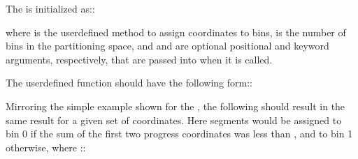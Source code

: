 \documentclass[letterpaper,10pt,english]{sphinxmanual}
\begin{document}
The  is initialized as::

\begin{sphinxVerbatim}[commandchars=\\\{\}]
     
\end{sphinxVerbatim}

where  is the user\sphinxhyphen{}defined method to assign coordinates to bins,
 is the number of bins in the partitioning space, and  and
 are optional positional and keyword arguments, respectively, that
are passed into  when it is called.

The user\sphinxhyphen{}defined function should have the following form::

\begin{sphinxVerbatim}[commandchars=\\\{\}]
   
\end{sphinxVerbatim}

Mirroring the simple example shown for the , the following
should result in the same result for a given set of coordinates. Here segments
would be assigned to bin 0 if the sum of the first two progress coordinates was
less than , and to bin 1 otherwise, where ::

\begin{sphinxVerbatim}[commandchars=\\\{\}]
  
     \PYG{p}{[}\PYG{p}{]}  \PYG{p}{[}\PYG{p}{]}  
         
         

    
\end{sphinxVerbatim}
\end{document}
